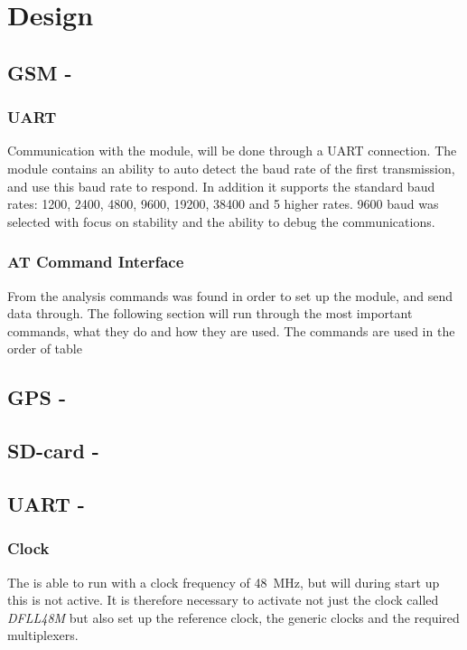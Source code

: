 
\chapter{Design}
\label{ch:Design}

\section{GSM - \SARA}

\subsection{UART}
Communication with the \SARA module, will be done through a UART connection. The module contains an ability to auto detect the baud rate of the first transmission, and use this baud rate to respond. In addition it supports the standard baud rates: \num{1200}, \num{2400}, \num{4800}, \num{9600}, \num{19200}, \num{38400} and 5 higher rates. \num{9600} baud was selected with focus on stability and the ability to debug the communications.

\subsection{AT Command Interface}
From the analysis commands was found in order to set up the module, and send data through. The following section will run through the most important commands, what they do and how they are used. The commands are used in the order of table 

\section{GPS - \GPS}





\section{SD-card - \SDsock}


\section{UART - \SAMD}

\subsection{Clock}
The \SAMD is able to run with a clock frequency of \SI{48}{\mega\hertz}, but will during start up this is not active.
It is therefore necessary to activate not just the clock called \textit{DFLL48M} but also set up the reference clock, the generic clocks and the required multiplexers.

